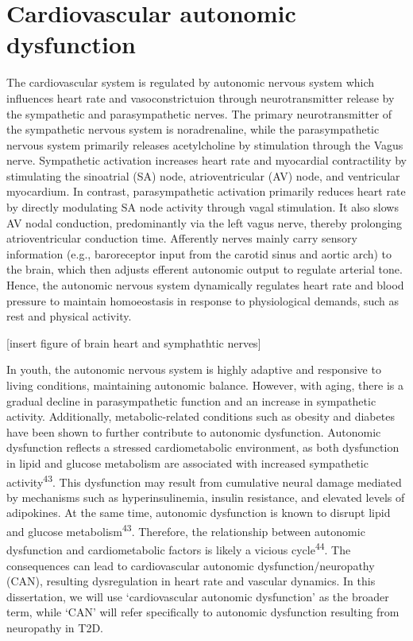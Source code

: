 \documentclass[
  a4paper,
  headsepline=true,
  open=any]{scrbook}
\begin{document}
\hypertarget{cardiovascular-autonomic-dysfunction}{%
\section{Cardiovascular autonomic
dysfunction}\label{cardiovascular-autonomic-dysfunction}}

The cardiovascular system is regulated by autonomic nervous system which
influences heart rate and vasoconstrictuion through neurotransmitter
release by the sympathetic and parasympathetic nerves. The primary
neurotransmitter of the sympathetic nervous system is noradrenaline,
while the parasympathetic nervous system primarily releases
acetylcholine by stimulation through the Vagus nerve. Sympathetic
activation increases heart rate and myocardial contractility by
stimulating the sinoatrial (SA) node, atrioventricular (AV) node, and
ventricular myocardium. In contrast, parasympathetic activation
primarily reduces heart rate by directly modulating SA node activity
through vagal stimulation. It also slows AV nodal conduction,
predominantly via the left vagus nerve, thereby prolonging
atrioventricular conduction time. Afferently nerves mainly carry sensory
information (e.g., baroreceptor input from the carotid sinus and aortic
arch) to the brain, which then adjusts efferent autonomic output to
regulate arterial tone. Hence, the autonomic nervous system dynamically
regulates heart rate and blood pressure to maintain homoeostasis in
response to physiological demands, such as rest and physical activity.

{[}insert figure of brain heart and symphathtic nerves{]}

In youth, the autonomic nervous system is highly adaptive and responsive
to living conditions, maintaining autonomic balance. However, with
aging, there is a gradual decline in parasympathetic function and an
increase in sympathetic activity. Additionally, metabolic-related
conditions such as obesity and diabetes have been shown to further
contribute to autonomic dysfunction. Autonomic dysfunction reflects a
stressed cardiometabolic environment, as both dysfunction in lipid and
glucose metabolism are associated with increased sympathetic
activity\textsuperscript{43}. This dysfunction may result from
cumulative neural damage mediated by mechanisms such as
hyperinsulinemia, insulin resistance, and elevated levels of adipokines.
At the same time, autonomic dysfunction is known to disrupt lipid and
glucose metabolism\textsuperscript{43}. Therefore, the relationship
between autonomic dysfunction and cardiometabolic factors is likely a
vicious cycle\textsuperscript{44}. The consequences can lead to
cardiovascular autonomic dysfunction/neuropathy (CAN), resulting
dysregulation in heart rate and vascular dynamics. In this dissertation,
we will use `cardiovascular autonomic dysfunction' as the broader term,
while `CAN' will refer specifically to autonomic dysfunction resulting
from neuropathy in T2D.
\end{document}
